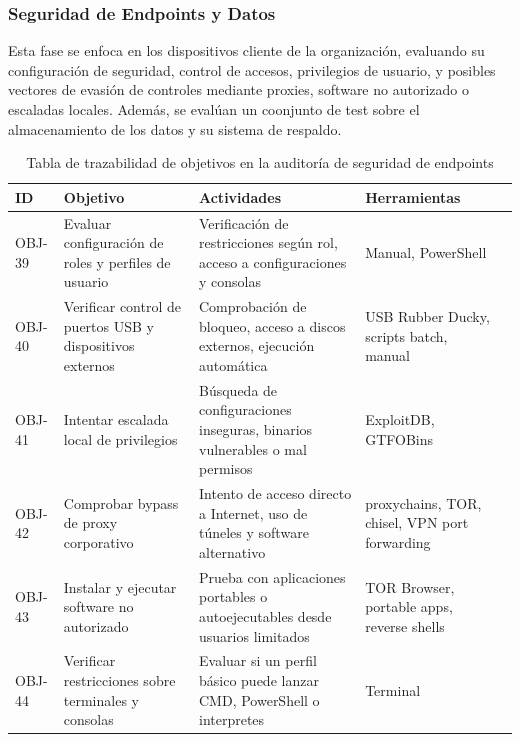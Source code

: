 \documentclass[a4paper, 10pt]{article}
\begin{document}
\subsubsection{Seguridad de Endpoints y Datos}

Esta fase se enfoca en los dispositivos cliente de la organización, evaluando su configuración de seguridad, control de accesos, privilegios de usuario, y posibles vectores de evasión de controles mediante proxies, software no autorizado o escaladas locales.
Además, se evalúan un coonjunto de test sobre el almacenamiento de los datos y su sistema de respaldo.
\begin{table}[H]
\centering
\renewcommand{\arraystretch}{1.4}
\begin{tabular}{|p{1.2cm}|p{4.2cm}|p{4.8cm}|p{3.8cm}|p{2.3cm}|}
\hline
\textbf{ID} & \textbf{Objetivo} & \textbf{Actividades} & \textbf{Herramientas}  \\
\hline
OBJ-39 & Evaluar configuración de roles y perfiles de usuario & Verificación de restricciones según rol, acceso a configuraciones y consolas & Manual, PowerShell  \\
\hline
OBJ-40 & Verificar control de puertos USB y dispositivos externos & Comprobación de bloqueo, acceso a discos externos, ejecución automática & USB Rubber Ducky, scripts batch, manual  \\
\hline
OBJ-41 & Intentar escalada local de privilegios & Búsqueda de configuraciones inseguras, binarios vulnerables o mal permisos & ExploitDB, GTFOBins  \\
\hline
OBJ-42 & Comprobar bypass de proxy corporativo & Intento de acceso directo a Internet, uso de túneles y software alternativo & proxychains, TOR, chisel, VPN port forwarding  \\
\hline
OBJ-43 & Instalar y ejecutar software no autorizado & Prueba con aplicaciones portables o autoejecutables desde usuarios limitados & TOR Browser, portable apps, reverse shells  \\
\hline
OBJ-44 & Verificar restricciones sobre terminales y consolas & Evaluar si un perfil básico puede lanzar CMD, PowerShell o interpretes & Terminal  \\
\hline
\end{tabular}
\caption{Tabla de trazabilidad de objetivos en la auditoría de seguridad de endpoints}
\end{table}
\end{document}
